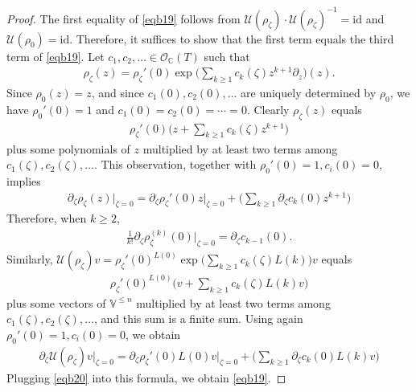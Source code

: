 \documentclass[11pt,b5paper,notitlepage]{article}
\theoremstyle{definition}
\theoremstyle{plain}
\newcommand{\mc}{\mathcal}
\newcommand{\scr}{\mathscr}
\newcommand{\Vbb}{\mathbb V}
\newcommand{\Cbb}{\mathbb C}
\newcommand{\<}{\left\langle}
\renewcommand{\>}{\right\rangle}
\newcommand{\id}{\mathrm{id}}
\numberwithin{equation}{section}
\begin{document}
\begin{proof}
The first equality of \eqref{eqb19} follows from $\mc U(\rho_\zeta)\cdot\mc U(\rho_\zeta)^{-1}=\id$ and $\mc U(\rho_0)=\id$. Therefore, it suffices to show that the first term equals the third term of \eqref{eqb19}. Let $c_1,c_2,\dots\in\scr O_{\Cbb}(T)$ such that 
\begin{gather*}
\rho_\zeta(z)=\rho_\zeta'(0)\exp\Big(\sum_{k\geq 1}c_k(\zeta)z^{k+1}\partial_z\Big)(z).
\end{gather*}
Since $\rho_0(z)=z$, and since $c_1(0),c_2(0),\dots$ are uniquely determined by $\rho_0$, we have $\rho_0'(0)=1$ and $c_1(0)=c_2(0)=\cdots=0$. Clearly $\rho_\zeta(z)$ equals
\begin{align*}
\rho_\zeta'(0)\Big(z+\sum_{k\geq 1}c_k(\zeta)z^{k+1}\Big)
\end{align*}
plus some polynomials of $z$ multiplied by at least two terms among $c_1(\zeta),c_2(\zeta),\dots$. This observation, together with $\rho_0'(0)=1,c_i(0)=0$, implies
\begin{align*}
\partial_\zeta\rho_\zeta(z)\Big|_{\zeta=0}=\partial_\zeta\rho_\zeta'(0)z\Big|_{\zeta=0}+\Big(\sum_{k\geq 1}\partial_\zeta c_k(0)z^{k+1}\Big)
\end{align*}
Therefore, when $k\geq 2$,
\begin{align*}
\frac 1{k!}\partial_\zeta\rho_\zeta^{(k)}(0)\Big|_{\zeta=0}=\partial_\zeta c_{k-1}(0). \tag{$\star$} \label{eqb20}
\end{align*}
Similarly, $\mc U(\rho_\zeta)v=\rho_\zeta'(0)^{L(0)}\exp\big(\sum_{k\geq1}c_k(\zeta)L(k)\big)v$ equals
\begin{align*}
\rho_\zeta'(0)^{L(0)}\Big( v+\sum_{k\geq1}c_k(\zeta)L(k)v\Big)
\end{align*}
plus some vectors of $\Vbb^{\leq n}$ multiplied by at least two terms among $c_1(\zeta),c_2(\zeta),\dots$, and this sum is a finite sum. Using again $\rho_0'(0)=1,c_i(0)=0$, we obtain
\begin{align*}
\partial_\zeta\mc U(\rho_\zeta)v|_{\zeta=0}=\partial_\zeta\rho_\zeta'(0) L(0)v\Big|_{\zeta=0}+\Big(\sum_{k\geq 1}\partial_\zeta c_k(0) L(k)v\Big)
\end{align*}
Plugging \eqref{eqb20} into this formula, we obtain \eqref{eqb19}.
\end{proof}
\end{document}
